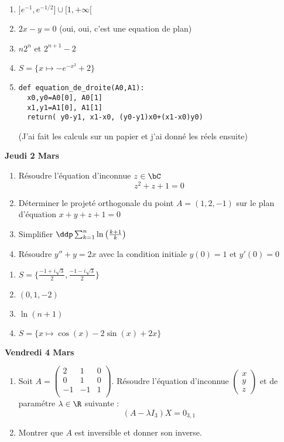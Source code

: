 \documentclass[a4paper, 11pt,reqno]{article}
\begin{document}
\begin{correction}
\begin{enumerate}
\item $]e^{-1}, e^{-1/2}] \cup [1,+\infty[$
\item $2x-y=0$ (oui, oui, c'est une equation de plan)
\item $n2^n$ et $2^{n+1}-2$
\item $S=\{ x\mapsto -e^{-x^2} +2\}$
\item 
\begin{lstlisting}
def equation_de_droite(A0,A1):
  x0,y0=A0[0], A0[1]
  x1,y1=A1[0], A1[1]
  return( y0-y1, x1-x0, (y0-y1)x0+(x1-x0)y0)
\end{lstlisting}
(J'ai fait les calculs sur un papier et j'ai donné les réels ensuite) 
\end{enumerate}
\end{correction}
\newpage

\begin{center}
\textbf{Jeudi 2  Mars}
\end{center}
\begin{enumerate}
\item Résoudre l'équation d'inconnue $z\in \bC$ 
$$z^2+z+1=0$$
\item Déterminer le projeté orthogonale du point $A=(1,2,-1)$ sur le plan d'équation $x+y+z+1=0$
\item Simplifier $\ddp \sum_{k=1}^n \ln\left( \frac{k+1}{k}\right)$
\item Résoudre $y''+y=2x$ avec la condition initiale $y(0)=1$ et $y'(0)=0$
\end{enumerate}


\begin{correction}
\begin{enumerate}
\item $S=\{ \frac{-1+i\sqrt{3}}{2}, \frac{-1-i\sqrt{3}}{2}\}$
\item $(0,1,-2)$
\item $\ln(n+1)$
\item $S=\{ x\mapsto \cos(x)-2\sin(x)+2x\}$
\end{enumerate}
\end{correction}

\newpage
\begin{center}
\textbf{Vendredi 4  Mars}
\end{center}

\begin{enumerate}
\item Soit $A=\begin{pmatrix}
2 &1& 0\\
 0&1 &0  \\
 -1&-1&1\\
\end{pmatrix}$. Résoudre l'équation d'inconnue $\begin{pmatrix}
x\\y\\z
\end{pmatrix}$ et de paramétre $\lambda \in \R$ suivante : 
$$(A -\lambda I_3) X = 0_{3,1}$$
\item Montrer que $A$ est inversible et donner son inverse.
\end{enumerate}
\end{document}
